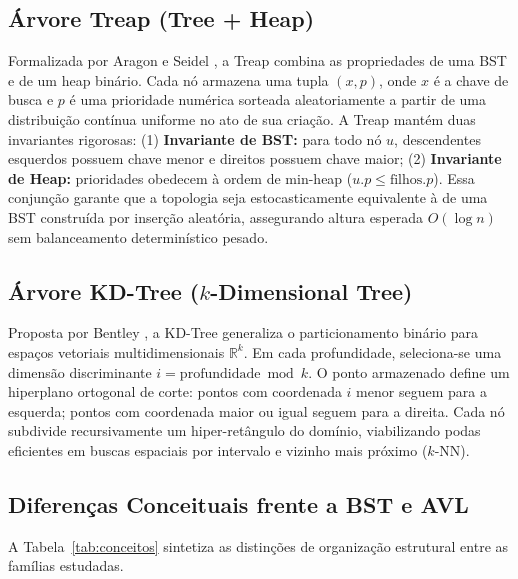 \documentclass[11pt,a4paper]{article}
\newcommand{\Ogrande}[1]{\ensuremath{O\!\left(#1\right)}}
\begin{document}
\subsection{Árvore Treap (Tree + Heap)}
Formalizada por Aragon e Seidel \cite{seidel1996}, a Treap combina as propriedades de uma BST e de um heap binário. Cada nó armazena uma tupla $(x, p)$, onde $x$ é a chave de busca e $p$ é uma prioridade numérica sorteada aleatoriamente a partir de uma distribuição contínua uniforme no ato de sua criação. A Treap mantém duas invariantes rigorosas: (1) \textbf{Invariante de BST:} para todo nó $u$, descendentes esquerdos possuem chave menor e direitos possuem chave maior; (2) \textbf{Invariante de Heap:} prioridades obedecem à ordem de min-heap ($u.p \le \text{filhos}.p$). Essa conjunção garante que a topologia seja estocasticamente equivalente à de uma BST construída por inserção aleatória, assegurando altura esperada $\Ogrande{\log n}$ sem balanceamento determinístico pesado.

\subsection{Árvore KD-Tree (\texorpdfstring{$k$}{k}-Dimensional Tree)}
Proposta por Bentley \cite{bentley1975}, a KD-Tree generaliza o particionamento binário para espaços vetoriais multidimensionais $\mathbb{R}^k$. Em cada profundidade, seleciona-se uma dimensão discriminante $i = \text{profundidade} \bmod k$. O ponto armazenado define um hiperplano ortogonal de corte: pontos com coordenada $i$ menor seguem para a esquerda; pontos com coordenada maior ou igual seguem para a direita. Cada nó subdivide recursivamente um hiper-retângulo do domínio, viabilizando podas eficientes em buscas espaciais por intervalo e vizinho mais próximo ($k\text{-NN}$).

\subsection{Diferenças Conceituais frente a BST e AVL}
A Tabela~\ref{tab:conceitos} sintetiza as distinções de organização estrutural entre as famílias estudadas.
\end{document}
